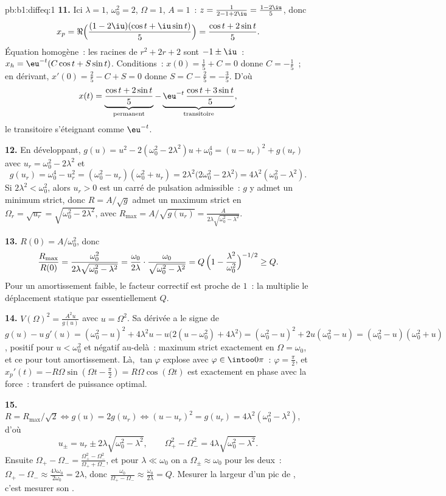 \begin{solution}{pb:b1:diffeq:1}
\textbf{11.} Ici $\lambda = 1$, $\omega_0^2 = 2$, $\Omega = 1$,
$A = 1$~: $z = \frac1{2 - 1 + 2\iu} = \frac{1 - 2\iu}5$, donc
\[
x_p = \Re\Bigl(\frac{(1 - 2\iu)(\cos t + \iu\sin t)}5\Bigr)
= \frac{\cos t + 2\sin t}5 .
\]
Équation homogène~: les racines de $r^2 + 2r + 2$ sont $-1 \pm \iu$~:
$x_h = \eu^{-t}(C\cos t + S\sin t)$. Conditions~: $x(0) = \frac15 + C
= 0$ donne $C = -\frac15$~; en dérivant, $x'(0) = \frac25 - C + S = 0$
donne $S = C - \frac25 = -\frac35$. D'où
\[
x(t) = \underbrace{\frac{\cos t + 2\sin t}5}_{\text{permanent}}
- \underbrace{\eu^{-t}\,\frac{\cos t + 3\sin
t}5}_{\text{transitoire}} ,
\]
le transitoire s'éteignant comme $\eu^{-t}$.

\textbf{12.} En développant, $g(u) = u^2 - 2(\omega_0^2 - 2\lambda^2)u
+ \omega_0^4 = (u - u_r)^2 + g(u_r)$ avec $u_r = \omega_0^2 -
2\lambda^2$ et
\[
g(u_r) = \omega_0^4 - u_r^2 = (\omega_0^2 - u_r)(\omega_0^2 +
u_r) = 2\lambda^2\bigl(2\omega_0^2 - 2\lambda^2\bigr) =
4\lambda^2(\omega_0^2 - \lambda^2) .
\]
Si $2\lambda^2 < \omega_0^2$, alors $u_r > 0$ est un carré de
pulsation admissible~: $g$ y admet un minimum strict, donc $R = A/\sqrt
g$ admet un maximum strict en $\Omega_r = \sqrt{u_r} =
\sqrt{\omega_0^2 - 2\lambda^2}$, avec $R_{\max} = A/\sqrt{g(u_r)}
= \frac{A}{2\lambda\sqrt{\omega_0^2 - \lambda^2}}$.

\textbf{13.} $R(0) = A/\omega_0^2$, donc
\[
\frac{R_{\max}}{R(0)}
= \frac{\omega_0^2}{2\lambda\sqrt{\omega_0^2 - \lambda^2}}
= \frac{\omega_0}{2\lambda}\cdot
\frac{\omega_0}{\sqrt{\omega_0^2 - \lambda^2}}
= Q\,\Bigl(1 - \frac{\lambda^2}{\omega_0^2}\Bigr)^{-1/2}
\geq Q .
\]
Pour un amortissement faible, le facteur correctif est proche de $1$~:
la  multiplie le déplacement statique par essentiellement
$Q$.

\textbf{14.} $V(\Omega)^2 = \frac{A^2 u}{g(u)}$ avec $u =
\Omega^2$. Sa dérivée a le signe de $g(u) - u\,g'(u) =
(\omega_0^2 - u)^2 + 4\lambda^2 u - u\bigl(2(u - \omega_0^2) +
4\lambda^2\bigr) = (\omega_0^2 - u)^2 + 2u(\omega_0^2 - u) =
(\omega_0^2 - u)(\omega_0^2 + u)$, positif pour $u < \omega_0^2$ et
négatif au-delà~: maximum strict exactement en $\Omega = \omega_0$,
et ce pour tout amortissement. Là, $\tan\varphi$ explose avec $\varphi
\in \intoo0\pi$~: $\varphi = \frac\pi2$, et $x_p'(t) =
-R\Omega\sin(\Omega t - \frac\pi2) = R\Omega\cos(\Omega t)$ est
exactement en phase avec la force~: transfert de puissance optimal.

\textbf{15.} $R = R_{\max}/\sqrt2 \iff g(u) = 2g(u_r) \iff (u -
u_r)^2 = g(u_r) = 4\lambda^2(\omega_0^2 - \lambda^2)$, d'où
\[
u_\pm = u_r \pm 2\lambda\sqrt{\omega_0^2 - \lambda^2},
\qquad
\Omega_+^2 - \Omega_-^2 = 4\lambda\sqrt{\omega_0^2 - \lambda^2} .
\]
Ensuite $\Omega_+ - \Omega_- = \frac{\Omega_+^2 -
\Omega_-^2}{\Omega_+ + \Omega_-}$, et pour $\lambda \ll \omega_0$ on a
$\Omega_\pm \approx \omega_0$ pour les deux~: $\Omega_+ - \Omega_-
\approx \frac{4\lambda\omega_0}{2\omega_0} = 2\lambda$, donc
$\frac{\omega_0}{\Omega_+ - \Omega_-} \approx
\frac{\omega_0}{2\lambda} = Q$. Mesurer la largeur d'un pic de
, c'est mesurer son .


\end{solution}
